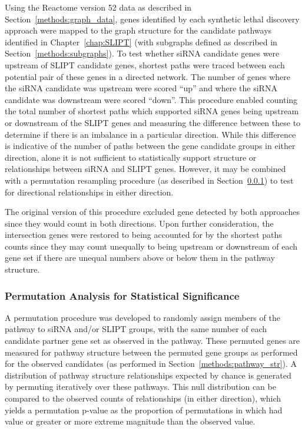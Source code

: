 Using the Reactome version 52 data \citep{Reactome} as described in Section~\ref{methods:graph_data}, genes identified by each synthetic lethal discovery approach were mapped to the graph structure for the candidate pathways identified in Chapter~\ref{chap:SLIPT} (with subgraphs defined as described in Section~\ref{methods:subgraphs}). To test whether \gls{siRNA} candidate genes were upstream of \gls{SLIPT} candidate genes, shortest paths were traced between each potential pair of these genes in a directed network. The number of genes where the \gls{siRNA} candidate was upstream were scored ``up'' and where the \gls{siRNA} candidate was downstream were scored ``down''.  This procedure enabled counting the total number of shortest paths which supported \gls{siRNA} genes being upstream or downstream of the \gls{SLIPT} genes and measuring the difference between these to determine if there is an imbalance in a particular direction. While this difference is indicative of the number of paths between the gene candidate groups in either direction, alone it is not sufficient to statistically support structure or relationships between \gls{siRNA} and \gls{SLIPT} genes. However, it may be combined with a permutation resampling procedure (as described in Section~\ref{methods:network_permutation}) to test for directional relationships in either direction.

The original version of this procedure excluded gene detected by both approaches since they would count in both directions. Upon further consideration, the intersection genes were restored to being accounted for by the shortest paths counts since they may count unequally to being upstream or downstream of each gene set if there are unequal numbers above or below them in the pathway structure.

\subsubsection{Permutation Analysis for Statistical Significance} \label{methods:network_permutation}
A permutation procedure was developed to randomly assign members of the pathway to \gls{siRNA} and/or \gls{SLIPT} groups, with the same number of each candidate partner gene set as observed in the pathway. These permuted genes are measured for pathway structure between the permuted gene groups as performed for the observed candidates (as performed in Section~\ref{methods:pathway_str}). A distribution of pathway structure relationships expected by chance is generated by permuting iteratively over these pathways. This null distribution can be compared to the observed counts of relationships (in either direction), which yields a permutation p-value as the proportion of permutations in which had value or greater or more extreme magnitude than the observed value.


